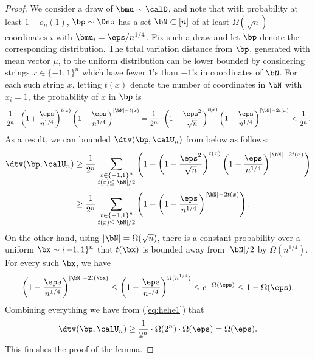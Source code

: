 \begin{proof}
We consider a draw of $\bmu \sim \calD$, and note that with probability at least $1-o_n(1)$, $\bp \sim \Dno$ has a set $\bN \subset [n]$ of at least $\Omega(\sqrt{n})$ coordinates $i$ with $\bmu_i = \eps/n^{1/4}$. Fix such a draw and let $\bp$ denote the corresponding distribution. The total variation distance from $\bp$, generated with mean vector $\mu$, to the uniform distribution can be lower bounded by considering strings $x \in \{-1,1\}^n$ which have fewer $1$'s than $-1$'s in coordinates of $\bN$. 
For each such string $x$, letting $t(x)$ denote the number of coordinates in $\bN$ with $x_i = 1$, the probability of $x$ in $\bp$ is
$$
\frac{1}{2^n}\cdot \left(1 + \frac{\eps}{n^{1/4}} \right)^{t(x)} \left( 1 - \frac{\eps}{n^{1/4}}\right)^{|\bN| - t(x)} 
=\frac{1}{2^n}\cdot \left(1 - \frac{\eps^2}{\sqrt{n}}\right)^{t(x)} \left(1 - \frac{\eps}{n^{1/4}}\right)^{|\bN| - 2t(x)}< \frac{1}{2^n}.
$$
As a result, we can bounded $\dtv(\bp,\calU_n)$ from below as follows:
\begin{align}
\dtv(\bp, \calU_n) %
     &\geq \frac{1}{2^n} \sum_{\substack{x \in \{-1,1\}^n \\ t(x) \leq |\bN|/2}} \left( 1 - \left(1 - \frac{\eps^2}{\sqrt{n}}\right)^{t(x)} \left(1 - \frac{\eps}{n^{1/4}}\right)^{|\bN| - 2t(x)}\right) \nonumber\\[0.5ex]
    &\ge
     \frac{1}{2^n} \sum_{\substack{x \in \{-1,1\}^n \\ t(x) \leq |\bN|/2}} \left( 1 -  \left(1 - \frac{\eps}{n^{1/4}}\right)^{|\bN| - 2t(x)}\right).\label{eq:hehe1}
\end{align}
On the other hand, using $|\bN| = \Omega(\sqrt{n})$, there is a constant probability over a uniform $\bx \sim \{-1,1\}^n$ that $t(\bx)$ is bounded away from $|\bN|/2$ by $\Omega(n^{1/4})$.
For every such $\bx$, we have 
\[ %
 \left(1 - \frac{\eps}{n^{1/4}}\right)^{|\bN| - 2t(\bx)} \leq \left(1 - \frac{\eps}{n^{1/4}}\right)^{\Omega(n^{1/4})}\le e^{-\Omega(\eps)}\le 1-\Omega(\eps). \]
Combining everything we have from (\ref{eq:hehe1}) that
$$
\dtv(\bp,\calU_n)\ge \frac{1}{2^n}\cdot \Omega(2^n)\cdot \Omega(\eps)=\Omega(\eps).
$$
This finishes the proof of the lemma.
\end{proof}


